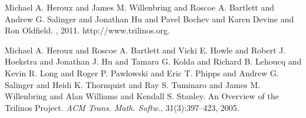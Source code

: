 
\begin{thebibliography}{1}
{\sc Michael A. Heroux and James M. Willenbring and Roscoe A. Bartlett and Andrew G. Salinger and Jonathan Hu and Pavel Bochev and Karen Devine and Ron Oldfield}.
, 2011.
\newblock http://www.trilinos.org.

{\sc Michael A. Heroux and Roscoe A. Bartlett and Vicki E. Howle and Robert J. Hoekstra and Jonathan J. Hu and Tamara G. Kolda and Richard B. Lehoucq and Kevin R. Long and Roger P. Pawlowski and Eric T. Phipps and Andrew G. Salinger and Heidi K. Thornquist and Ray S. Tuminaro and James M. Willenbring and Alan Williams and Kendall S. Stanley}. {An Overview of the Trilinos Project}. {\em ACM Trans. Math. Softw.}, 31(3):397--423, 2005.
\end{thebibliography}